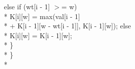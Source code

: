 \documentclass[12pt]{book}
\begin{document}
\phantom{x} \hspace{3ex}\phantom{x} \hspace{3ex} \phantom{x} \hspace{3ex}\phantom{x} \hspace{3ex} \phantom{x} \hspace{3ex}\phantom{x} \hspace{3ex}          else if (wt[i - 1] $>$= w) \\*
\phantom{x} \hspace{3ex}\phantom{x} \hspace{3ex} \phantom{x} \hspace{3ex}\phantom{x} \hspace{3ex} \phantom{x} \hspace{3ex}\phantom{x} \hspace{3ex} \phantom{x} \hspace{3ex}\phantom{x} \hspace{3ex}             K[i][w] = max(val[i - 1] \\*
                        + K[i - 1][w - wt[i - 1]], 
                        K[i - 1][w]); 
\phantom{x} \hspace{3ex}\phantom{x} \hspace{3ex} \phantom{x} \hspace{3ex}\phantom{x} \hspace{3ex} \phantom{x} \hspace{3ex}\phantom{x} \hspace{3ex}          else\\*
\phantom{x} \hspace{3ex}\phantom{x} \hspace{3ex} \phantom{x} \hspace{3ex}\phantom{x} \hspace{3ex} \phantom{x} \hspace{3ex}\phantom{x} \hspace{3ex} \phantom{x} \hspace{3ex}\phantom{x} \hspace{3ex}             K[i][w] = K[i - 1][w]; \\*
\phantom{x} \hspace{3ex}\phantom{x} \hspace{3ex} \phantom{x} \hspace{3ex}\phantom{x} \hspace{3ex}       \} \\*
\phantom{x} \hspace{3ex}\phantom{x} \hspace{3ex}    \} \\*
\end{document}
